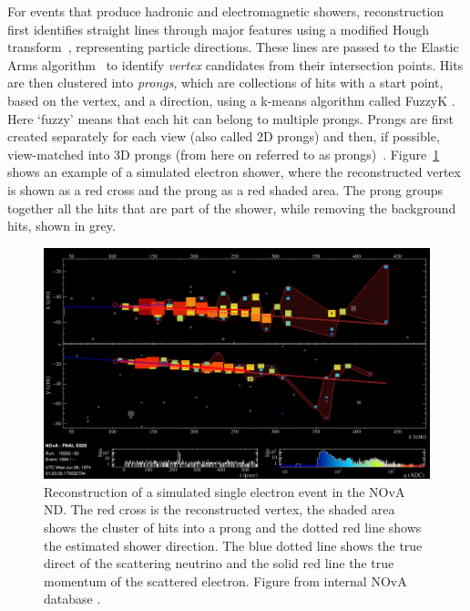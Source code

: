 For events that produce hadronic and electromagnetic showers, reconstruction first identifies straight lines through major features using a modified Hough transform~\cite{HoughTransform.pdf}, representing particle directions. These lines are passed to the Elastic Arms algorithm~\cite{ElasticArms.pdf} to identify \textit{vertex} candidates from their intersection points. Hits are then clustered into \textit{prongs}, which are collections of hits with a start point, based on the vertex, and a direction, using a k-means algorithm called FuzzyK \cite{FuzzyKClustering.pdf,FuzzyKFuzzyness.pdf}. Here `fuzzy' means that each hit can belong to multiple prongs. Prongs are first created separately for each view (also called 2D prongs) and then, if possible, view-matched into 3D prongs (from here on referred to as prongs)~\cite{NOvAReco.pdf}. Figure~\ref{fig:NOvARecoEVD} shows an example of a  simulated electron shower, where the reconstructed vertex is shown as a red cross and the prong as a red shaded area. The prong groups together all the hits that are part of the shower, while removing the background hits, shown in grey.

\begin{figure}[ht]
\centering
\includegraphics[width=1\textwidth]{Plots/NOvAExperiment/ElectronRecoEVD.png}
\caption[NOvA reconstruction of a single electron]{Reconstruction of a simulated single electron event in the \acrshort{NOvA} \acrshort{ND}. The red cross is the reconstructed vertex, the shaded area shows the cluster of hits into a prong and the dotted red line shows the estimated shower direction. The blue dotted line shows the true direct of the scattering neutrino and the solid red line the true momentum of the scattered electron. Figure from internal \acrshort{NOvA} database \cite{NOvA-doc-13862}.}
\label{fig:NOvARecoEVD}
\end{figure}


